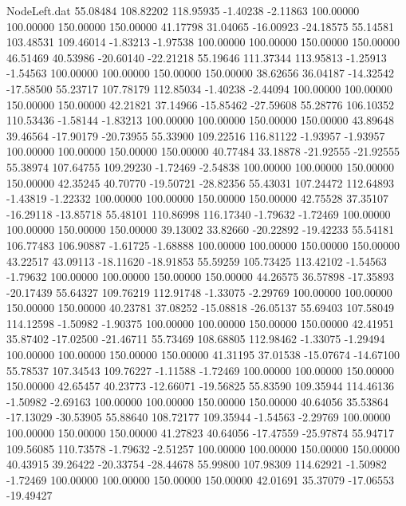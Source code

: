 \begin{filecontents}{NodeLeft.dat}
  55.08484  108.82202  118.95935    -1.40238   -2.11863  100.00000  100.00000  150.00000  150.00000   41.17798   31.04065  -16.00923  -24.18575
  55.14581  103.48531  109.46014    -1.83213   -1.97538  100.00000  100.00000  150.00000  150.00000   46.51469   40.53986  -20.60140  -22.21218
  55.19646  111.37344  113.95813    -1.25913   -1.54563  100.00000  100.00000  150.00000  150.00000   38.62656   36.04187  -14.32542  -17.58500
  55.23717  107.78179  112.85034    -1.40238   -2.44094  100.00000  100.00000  150.00000  150.00000   42.21821   37.14966  -15.85462  -27.59608
  55.28776  106.10352  110.53436    -1.58144   -1.83213  100.00000  100.00000  150.00000  150.00000   43.89648   39.46564  -17.90179  -20.73955
  55.33900  109.22516  116.81122    -1.93957   -1.93957  100.00000  100.00000  150.00000  150.00000   40.77484   33.18878  -21.92555  -21.92555
  55.38974  107.64755  109.29230    -1.72469   -2.54838  100.00000  100.00000  150.00000  150.00000   42.35245   40.70770  -19.50721  -28.82356
  55.43031  107.24472  112.64893    -1.43819   -1.22332  100.00000  100.00000  150.00000  150.00000   42.75528   37.35107  -16.29118  -13.85718
  55.48101  110.86998  116.17340    -1.79632   -1.72469  100.00000  100.00000  150.00000  150.00000   39.13002   33.82660  -20.22892  -19.42233
  55.54181  106.77483  106.90887    -1.61725   -1.68888  100.00000  100.00000  150.00000  150.00000   43.22517   43.09113  -18.11620  -18.91853
  55.59259  105.73425  113.42102    -1.54563   -1.79632  100.00000  100.00000  150.00000  150.00000   44.26575   36.57898  -17.35893  -20.17439
  55.64327  109.76219  112.91748    -1.33075   -2.29769  100.00000  100.00000  150.00000  150.00000   40.23781   37.08252  -15.08818  -26.05137
  55.69403  107.58049  114.12598    -1.50982   -1.90375  100.00000  100.00000  150.00000  150.00000   42.41951   35.87402  -17.02500  -21.46711
  55.73469  108.68805  112.98462    -1.33075   -1.29494  100.00000  100.00000  150.00000  150.00000   41.31195   37.01538  -15.07674  -14.67100
  55.78537  107.34543  109.76227    -1.11588   -1.72469  100.00000  100.00000  150.00000  150.00000   42.65457   40.23773  -12.66071  -19.56825
  55.83590  109.35944  114.46136    -1.50982   -2.69163  100.00000  100.00000  150.00000  150.00000   40.64056   35.53864  -17.13029  -30.53905
  55.88640  108.72177  109.35944    -1.54563   -2.29769  100.00000  100.00000  150.00000  150.00000   41.27823   40.64056  -17.47559  -25.97874
  55.94717  109.56085  110.73578    -1.79632   -2.51257  100.00000  100.00000  150.00000  150.00000   40.43915   39.26422  -20.33754  -28.44678
  55.99800  107.98309  114.62921    -1.50982   -1.72469  100.00000  100.00000  150.00000  150.00000   42.01691   35.37079  -17.06553  -19.49427

\end{filecontents}
